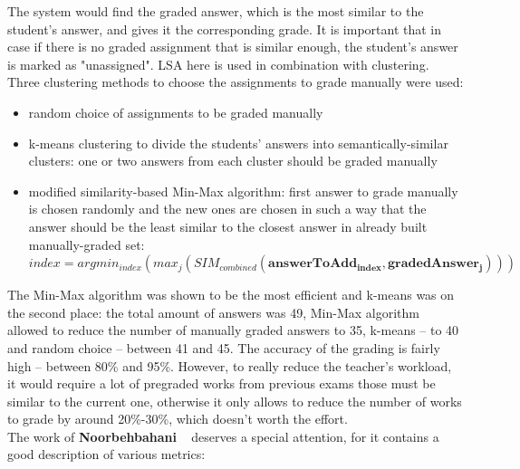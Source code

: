 \documentclass[11pt]{report}
\numberwithin{equation}{section} %
\begin{document}
The system would find the graded answer, which is the most similar to the student's answer, and gives it the corresponding grade. It is important that in case if there is no graded assignment that is similar enough, the student's answer is marked as "unassigned". LSA here is used in combination with clustering. Three clustering methods to choose the assignments to grade manually were used:
\begin{itemize}
\item random choice of assignments to be graded manually
\item k-means clustering to divide the students' answers into semantically-similar clusters: one or two answers from each cluster should be graded manually
\item modified similarity-based Min-Max algorithm: first answer to grade manually is chosen randomly and the new ones are chosen in such a way that the answer should be the least similar to the closest answer in already built manually-graded set:\\ $index = argmin_{index}(max_j (SIM_{combined} (\pmb{answerToAdd_{index}}, \pmb{gradedAnswer_j})))$
\end{itemize}
The Min-Max algorithm was shown to be the most efficient and k-means was on the second place: the total amount of answers was 49, Min-Max algorithm allowed to reduce the number of manually graded answers to 35, k-means -- to 40 and random choice -- between 41 and 45. The accuracy of the grading is fairly high -- between 80\% and 95\%. However, to really reduce the teacher's workload, it would require a lot of pregraded works from previous exams those must be similar to the current one, otherwise it only allows to reduce the number of works to grade by around 20\%-30\%, which doesn't worth the effort. \\

The work of \textbf{Noorbehbahani} ~\cite{Noorbehbahani} deserves a special attention, for it contains a good description of various metrics:
\end{document}
